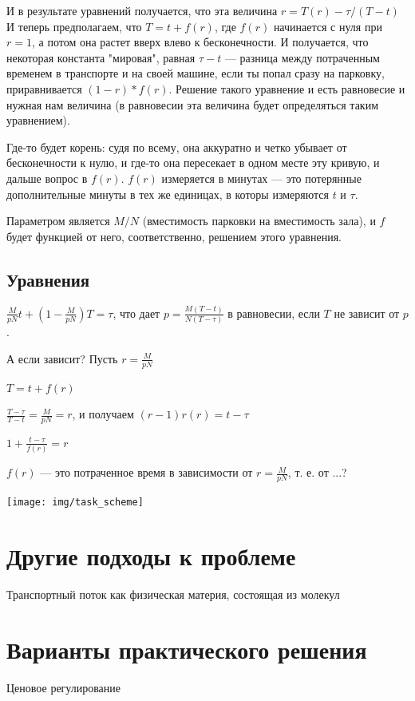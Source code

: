 И в результате уравнений получается, что эта величина $r = T(r) -  \tau/(T-t)$
И теперь предполагаем, что $T = t + f(r)$, где $f(r)$ начинается с нуля при $r = 1$, а потом она растет вверх влево к бесконечности. И получается, что некоторая константа "мировая", равная $\tau - t$ --- разница между потраченным временем в транспорте и на своей машине, если ты попал сразу на парковку, приравнивается $(1-r)*f(r)$. Решение такого уравнение и есть равновесие и нужная нам величина (в равновесии эта величина будет определяться таким уравнением).

Где-то будет корень: судя по всему, она аккуратно и четко убывает от бесконечности к нулю, и где-то она пересекает в одном месте эту кривую, и дальше вопрос в  $f(r)$. $f(r)$ измеряется в минутах --- это потерянные дополнительные минуты в тех же единицах, в которы измеряются $t$ и $\tau$.

Параметром является $M/N$ (вместимость парковки на вместимость зала), и $f$ будет функцией от него, соответственно, решением этого уравнения.


\subsection{Уравнения}

$\frac{M}{pN} t + (1 - \frac{M}{pN}) T = \tau$,
что дает
$p=\frac{M(T-t)}{N(T-\tau)}$ в равновесии, если $T$ не зависит от $p$.

А если зависит? Пусть $r = \frac{M}{pN}$

$T = t + f(r)$

$\frac{T-\tau}{T-t} = \frac{M}{pN} = r$, и получаем $(r-1)r(r) = t - \tau$

$1 + \frac{t-\tau}{f(r)} = r$

$f(r)$ --- это потраченное время в зависимости от $r = \frac{M}{pN}$, т. е. от ...?





\bigskip

\texttt{[image: img/task\_scheme]}



\section{Другие подходы к проблеме}
Транспортный поток как физическая материя, состоящая из молекул \cite[168]{lukanin}
\section{Варианты практического решения}
Ценовое регулирование
